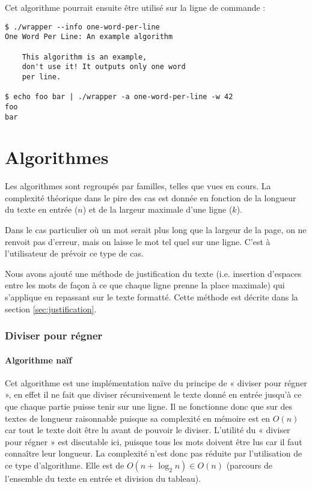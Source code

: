 \documentclass[a4paper, 11pt]{article}
\begin{document}
Cet algorithme pourrait ensuite être utilisé sur la ligne de commande :

\begin{verbatim}
$ ./wrapper --info one-word-per-line
One Word Per Line: An example algorithm

    This algorithm is an example,
    don't use it! It outputs only one word
    per line.

$ echo foo bar | ./wrapper -a one-word-per-line -w 42
foo
bar
\end{verbatim}

\part{Algorithmes}

Les algorithmes sont regroupés par familles, telles que vues en cours.
La complexité théorique dans le pire des cas est donnée en fonction de la
longueur du texte en entrée ($n$) et de la largeur maximale d'une ligne ($k$).

Dans le cas particulier où un mot serait plus long que la largeur de la page, on
ne renvoit pas d'erreur, mais on laisse le mot tel quel sur une ligne. C'est à
l'utilisateur de prévoir ce type de cas.

Nous avons ajouté une méthode de justification du texte (i.e. insertion
d'espaces entre les mots de façon à ce que chaque ligne prenne la place
maximale) qui s'applique en repassant sur le texte formatté. Cette méthode est
décrite dans la section \ref{sec:justification}.

\section{Diviser pour régner}

\subsection{Algorithme naïf}

Cet algorithme est une implémentation naïve du principe de « diviser pour régner
», en effet il ne fait que diviser récursivement le texte donné en entrée
jusqu'à ce que chaque partie puisse tenir sur une ligne. Il ne fonctionne donc
que sur des textes de longueur raisonnable puisque sa complexité en mémoire est
en $O(n)$ car tout le texte doit être lu avant de pouvoir le diviser. L'utilité
du « diviser pour régner » est discutable ici, puisque tous les mots doivent
être lus car il faut connaître leur longueur. La complexité n'est donc pas
réduite par l'utilisation de ce type d'algorithme. Elle est de
$O(n+\log_2 n) \in O(n)$ (parcours de l'ensemble du texte en entrée et division
du tableau).
\end{document}
